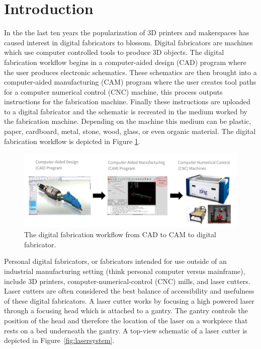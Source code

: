 

\section{Introduction}



In the the last ten years the popularization of 3D printers and makerspaces has caused interest in digital fabricators to blossom. Digital fabricators are machines which use computer controlled tools to produce 3D objects. The digital fabrication workflow begins in a computer-aided design (CAD) program where the user produces electronic schematics. These schematics are then brought into a computer-aided manufacturing (CAM) program where the user creates tool paths for a computer numerical control (CNC) machine, this process outputs instructions for the fabrication machine. Finally these instructions are uploaded to a digital fabricator and the schematic is recreated in the medium worked by the fabrication machine. Depending on the machine this medium can be plastic, paper, cardboard, metal, stone, wood, glass, or even organic material. The digital fabrication workflow is depicted in Figure \ref{fig:digiFabWorkflow}.

\begin{figure}[H]
  \includegraphics[width=\linewidth]{digiFabWorkflow.jpg}
  \caption{The digital fabrication workflow from CAD to CAM to digital fabricator.}
  \label{fig:digiFabWorkflow}
\end{figure}

Personal digital fabricators, or fabricators intended for use outside of an industrial manufacturing setting (think personal computer versus mainframe), include 3D printers, computer-numerical-control (CNC) mills, and laser cutters. Laser cutters are often considered the best balance of accessibility and usefulness of these digital fabricators. A laser cutter works by focusing a high powered laser through a focusing head which is attached to a gantry. The gantry controls the position of the head and therefore the location of the laser on a workpiece that rests on a bed underneath the gantry. A top-view schematic of a laser cutter is depicted in Figure~\ref{fig:lasersystem}.

